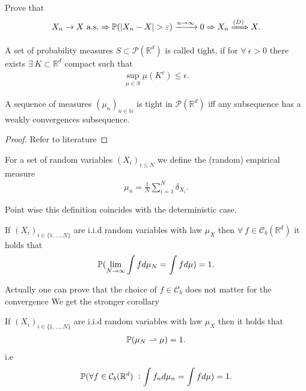\begin{exercise}
 Prove that 
 \begin{align*}
   X_n \to  X \ \text{a.s.} \implies \P(\abs{X_n - X} > \epsilon ) \xrightarrow{n\to \infty} 0 \implies X_n \xRightarrow{(D)} X
 .\end{align*}
\end{exercise}
\begin{definition}[Tightness]
 A set of probability measures $S \subset  \mathcal{P}(\mathbb{R}^{d} )$  is called tight, if 
 for $\forall \ \epsilon  > 0$ there exists $\exists \  K \subset  \mathbb{R}^{d} $ compact such that 
 \begin{align*}
   \sup_{\mu  \in  S} \mu(K^{c} )  \le  \epsilon 
 .\end{align*}
\end{definition}
\begin{theorem}
  A sequence of measures $(\mu_n)_{n \in  \mathbb{N}}$  is tight in $\mathcal{P}(\mathbb{R}^{d} )$ iff 
  any subsequence has a weakly convergences subsequence.
\end{theorem}
\begin{proof}
 Refer to literature 
\end{proof}
\begin{definition}\label{empirical_stochastic}
  For a set of  random variables $(X_i)_{i\le N}$  we define the (random) empirical measure 
  \begin{align*}
    \mu_n = \frac{1}{N}\sum_{i=1}^{N} \delta_{X_i} 
  .\end{align*}
\end{definition}
Point wise this definition coincides with the deterministic case.
\begin{corollary}
  If  $(X_i)_{i \in  \{1,\ldots ,N\}  }$ are i.i.d random variables with law $\mu_{X}$ then  $\forall  \ f \in  \mathcal{C}_b(\mathbb{R}^{d} ) $ it holds that
  \begin{align*}
    \P(\lim_{N \to \infty} \int  f d \mu_N = \int f d\mu ) = 1
  .\end{align*}
\end{corollary}
Actually one can prove that the choice of $f \in  \mathcal{C}_b$ does not matter for the convergence 
We get the stronger corollary
\begin{corollary}
  If  $(X_i)_{i \in  \{1,\ldots ,N\}  }$ are i.i.d random variables with law $\mu_{X}$ then  it holds that
\begin{align*}
  \P(\mu_N \rightharpoonup \mu ) = 1
.\end{align*}
i.e 
\begin{align*}
 \P( \forall  f \in  \mathcal{C}_b(\mathbb{R}^{d} ) \ : \int f_n d\mu_n = \int  f d\mu )  = 1
.\end{align*}
\end{corollary}
